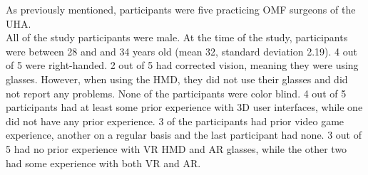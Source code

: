 As previously mentioned, participants were five practicing OMF surgeons of the UHA.
\\ All of the study participants were male.
At the time of the study, participants were between 28 and and 34 years old (mean 32, standard deviation 2.19).
4 out of 5 were right-handed.
2 out of 5 had corrected vision, meaning they were using glasses.
However, when using the HMD, they did not use their glasses and did not report any problems.
None of the participants were color blind.
4 out of 5 participants had at least some prior experience with 3D user interfaces, while one did not have any prior experience.
3 of the participants had prior video game experience, another on a regular basis and the last participant had none.
3 out of 5 had no prior experience with VR HMD and AR glasses, while the other two had some experience with both VR and AR.